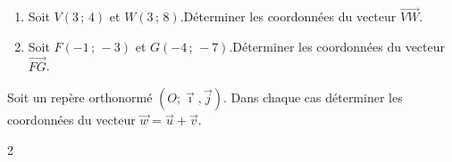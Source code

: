 {\begin{Exercice}
\begin{enumerate}[itemsep=1em]
	\item \begin{minipage}[t]{\linewidth}Soit $V\left(3\,;\,4\right)$ et $W\left(3\,;\,8\right)$.Déterminer les coordonnées du vecteur $\overrightarrow{VW}$.\end{minipage}
	\item \begin{minipage}[t]{\linewidth}Soit $F\left(-1\,;\,-3\right)$ et $G\left(-4\,;\,-7\right)$.Déterminer les coordonnées du vecteur $\overrightarrow{FG}$.\end{minipage}
\end{enumerate}
\end{Exercice}

\begin{Exercice}%
Soit un repère orthonormé $(O;\vec \imath, \overrightarrow{j})$. Dans chaque cas déterminer les coordonnées du vecteur $\overrightarrow{w}=\overrightarrow{u}+\overrightarrow{v}$.
\vspace{-0.5cm}
\begin{multicols}{2}
\begin{enumerate}[itemsep=1em]


\end{enumerate}
\end{multicols}
\end{Exercice}}
